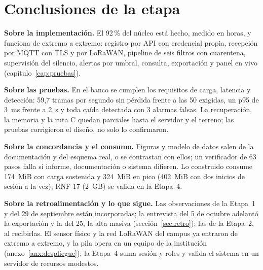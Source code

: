 \chapter{Conclusiones de la etapa}

\textbf{Sobre la implementación.} El 92\,\% del núcleo está hecho, medido en horas, y funciona de extremo a
extremo: registro por API con credencial propia, recepción por MQTT con TLS y por LoRaWAN, pipeline de
seis filtros con cuarentena, supervisión del silencio, alertas por umbral, consulta, exportación y panel en vivo
(capítulo~\ref{cap:pruebas}).

\textbf{Sobre las pruebas.} En el banco se cumplen los requisitos de carga, latencia y detección: 59,7 tramas por
segundo sin pérdida frente a las 50 exigidas, un p95 de 3~ms frente a 2~s y toda caída detectada con 3 alarmas falsas.
La recuperación, la memoria y la ruta C quedan parciales hasta el servidor y el terreno; las pruebas corrigieron el diseño, no solo lo confirmaron.

\textbf{Sobre la concordancia y el consumo.} Figuras y modelo de datos salen de la documentación y del esquema real, o se contrastan con ellos; un verificador de 63 pasos falla si informe, documentación o sistema difieren. Lo construido consume 174~MiB con carga sostenida y 324~MiB en pico (402~MiB con dos inicios de sesión a la vez); RNF-17 (2~GB)
se valida en la Etapa~4.

\textbf{Sobre la retroalimentación y lo que sigue.} Las observaciones de la Etapa~1 y del 29 de septiembre están
incorporadas; la entrevista del 5 de octubre adelantó la exportación y la del 25, la alta masiva (sección~\ref{sec:retro}); las de la Etapa~2, al recibirlas. El sensor físico y la red LoRaWAN del campus ya entraron de extremo a extremo, y la pila opera en un equipo de la institución (anexo~\ref{anx:despliegue}); la Etapa~4
suma sesión y roles y valida el sistema en un servidor de recursos modestos.
